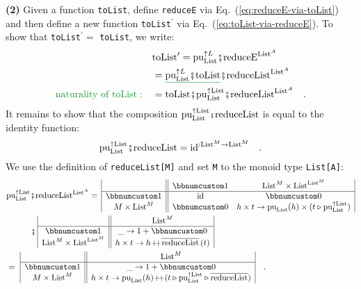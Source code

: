 \textbf{(2)} Given a function \lstinline!toList!, define \lstinline!reduceE!
via Eq.~(\ref{eq:reduceE-via-toList}) and then define a new function
\lstinline!toList!$^{\prime}$ via Eq.~(\ref{eq:toList-via-reduceE}).
To show that \lstinline!toList!$^{\prime}=$ \lstinline!toList!,
we write:
\begin{align*}
 & \text{toList}^{\prime}=\text{pu}_{\text{List}}^{\uparrow L}\bef\text{reduceE}^{\text{List}^{A}}\\
 & =\gunderline{\text{pu}_{\text{List}}^{\uparrow L}\bef\text{toList}}\bef\text{reduceList}^{\text{List}^{A}}\\
{\color{greenunder}\text{naturality of }\text{toList}:}\quad & =\text{toList}\bef\text{pu}_{\text{List}}^{\uparrow\text{List}}\bef\text{reduceList}^{\text{List}^{A}}\quad.
\end{align*}
It remains to show that the composition $\text{pu}_{\text{List}}^{\uparrow\text{List}}\bef\text{reduceList}$
is equal to the identity function:
\begin{equation}
\text{pu}_{\text{List}}^{\uparrow\text{List}}\bef\text{reduceList}=\text{id}^{:\text{List}^{M}\rightarrow\text{List}^{M}}\quad.\label{eq:identity-for-reduceList-and-pure}
\end{equation}
We use the definition of \lstinline!reduceList[M]! and set \lstinline!M!
to the monoid type \lstinline!List[A]!:
\begin{align*}
 & \text{pu}_{\text{List}}^{\uparrow\text{List}}\bef\text{reduceList}^{\text{List}^{A}}=\,\begin{array}{|c||cc|}
 & \bbnum 1 & \text{List}^{M}\times\text{List}^{\text{List}^{M}}\\
\hline \bbnum 1 & \text{id} & \bbnum 0\\
M\times\text{List}^{M} & \bbnum 0 & h\times t\rightarrow\text{pu}_{\text{List}}(h)\times(t\triangleright\text{pu}_{\text{List}}^{\uparrow\text{List}})
\end{array}\\
 & \quad\quad\quad\bef\,\begin{array}{|c||c|}
 & \text{List}^{M}\\
\hline \bbnum 1 & \_\rightarrow1+\bbnum 0\\
\text{List}^{M}\times\text{List}^{\text{List}^{M}} & h\times t\rightarrow h\pplus\overline{\text{reduceList}}\left(t\right)
\end{array}\\
 & =\,\,\begin{array}{|c||c|}
 & \text{List}^{M}\\
\hline \bbnum 1 & \_\rightarrow1+\bbnum 0\\
M\times\text{List}^{M} & h\times t\rightarrow\text{pu}_{\text{List}}(h)\pplus(t\triangleright\text{pu}_{\text{List}}^{\uparrow\text{List}}\triangleright\overline{\text{reduceList}})
\end{array}\quad.
\end{align*}
